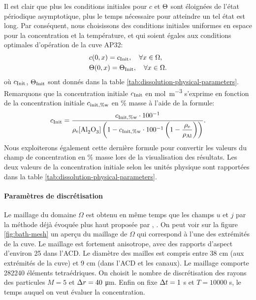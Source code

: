 Il est clair que plus les conditions initiales pour $c$ et
$\Theta$ sont éloignées de l'état périodique
asymptotique, plus le temps nécessaire pour atteindre un tel état est
long. Par conséquent, nous choisissons des conditions initiales
uniformes en espace pour la concentration et la température, et qui
soient égales aux conditions optimales d'opération de la cuve AP32:
\begin{align*}
  & c(0, x) = c_\text{Init},\quad\forall x\in\Omega,\\
  & \Theta(0, x) = \Theta_\text{Init},\quad\forall x\in\Omega.
\end{align*}
où $c_\text{Init}$, $\Theta_\text{Init}$ sont donnés dans la table
\ref{tab:dissolution-physical-parameters}. Remarquons que la
concentration initiale $c_\text{Init}$ en \si{\mol\per\cubic\meter} s'exprime
en fonction de la concentration initiale
$c_{\text{init},\%\mathrm w}$ en \% masse à l'aide de la
formule:
\begin{equation*}
  \cinit = \frac{\cinitwp \cdot
    100^{-1}}{\electrolytedensity[\cee{Al2O3}]\parent{1 - \cinitwp\cdot
      100^{-1}\parent{1 - \displaystyle\frac{\electrolytedensity}{\aluminadensity}}}}.
\end{equation*}
Nous exploiterons également cette dernière formule pour convertir les
valeurs du champ de concentration en \% masse lors de la visualisation
des résultats. Les deux valeurs de la concentration initiale selon les
unités physique sont rapportées dans la table
\ref{tab:dissolution-physical-parameters}.

\paragraph{Paramètres de discrétisation}
Le maillage du domaine $\Omega$ est obtenu en même temps que les
champs $u$ et $j$ par la méthode déjà évoquée plus haut proposée par
\cite{Steiner2009}, \cite{Rochat2016}. On peut voir sur la figure
\ref{fig:bath-mesh} un aperçu du maillage de $\Omega$ qui correspond à
l'une des extrémités de la cuve. Le maillage est fortement anisotrope,
avec des rapports d'aspect d'environ \num{25} dans l'ACD. Le diamètre
des mailles est compris entre \num{38} \si{\centi\meter} (aux
extrémités de la cuve) et \num{9} \si{\centi\meter} (dans l'ACD et les
canaux). Le maillage comporte \num{282240} éléments tetraédriques. On
choisit le nombre de discrétisation des rayons des particules $M = 5$
et $\Delta r = \num{40}$ \si{\micro\meter}. Enfin on fixe $\Delta t = 1$
\si{\second} et $T = \num{10000}$ \si{\second}, le temps auquel on
veut évaluer la concentration.

